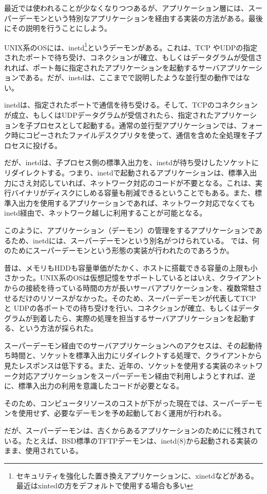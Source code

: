最近では使われることが少なくなりつつあるが、アプリケーション層には、スーパーデーモンという特別なアプリケーションを経由する実装の方法がある。最後にその説明を行うことにしよう。

UNIX系のOSには、inetd\footnote{セキュリティを強化した置き換えアプリケーションに、xinetdなどがある。最近はxintedの方をデフォルトで使用する場合も多い}というデーモンがある。これは、TCP やUDPの指定されたポートで待ち受け、コネクションが確立、もしくはデータグラムが受信されれば、ポート毎に指定されたアプリケーションを起動するサーバアプリケーションである。だが、inetdは、ここまでで説明したような並行型の動作ではない。

inetdは、指定されたポートで通信を待ち受ける。そして、TCPのコネクションが成立、もしくはUDPデータグラムが受信されたら、指定されたアプリケーションを子プロセスとして起動する。通常の並行型アプリケーションでは、フォーク時にコピーされたファイルデスクプリタを使って、通信を含めた全処理を子プロセスに投げる。

だが、inetdは、子プロセス側の標準入出力を、inetdが待ち受けしたソケットにリダイレクトする。つまり、inetdで起動されるアプリケーションは、標準入出力にさえ対応していれば、ネットワーク対応のコードが不要となる。これは、実行バイナリがディスクにしめる容量も削減できるということでもある。また、標準入出力を使用するアプリケーションであれば、ネットワーク対応でなくてもinetd経由で、ネットワーク越しに利用することが可能となる。

このように、アプリケーション（デーモン）の管理をするアプリケーションであるため、inetdには、スーパーデーモンという別名がつけられている。
では、何のためにスーパーデーモンという形態の実装が行われたのであろうか。

昔は、メモリもHDDも容量単価がたかく、ホストに搭載できる容量の上限も小さかった。UNIX系のOSは仮想記憶をサポートしているとはいえ、クライアントからの接続を待っている時間の方が長いサーバアプリケーションを、複数常駐させるだけのリソースがなかった。そのため、スーパーデーモンが代表してTCPと UDPの各ポートでの待ち受けを行い、コネクションが確立、もしくはデータグラムが到着したら、実際の処理を担当するサーバアプリケーションを起動する、という方法が採られた。

スーパーデーモン経由でのサーバアプリケーションへのアクセスは、その起動待ち時間と、ソケットを標準入出力にリダイレクトする処理で、クライアントから見たレスポンスは低下する。また、近年の、ソケットを使用する実装のネットワーク対応アプリケーションをスーパーデーモン経由で利用しようとすれば、逆に、標準入出力の利用を意識したコードが必要となる。

そのため、コンピュータリソースのコストが下がった現在では、スーパーデーモンを使用せず、必要なデーモンを予め起動しておく運用が行われる。

だが、スーパーデーモンは、古くからあるアプリケーションのためにに残されている。たとえば、BSD標準のTFTPデーモンは、inetd(8)から起動される実装のまま、使用されている。

